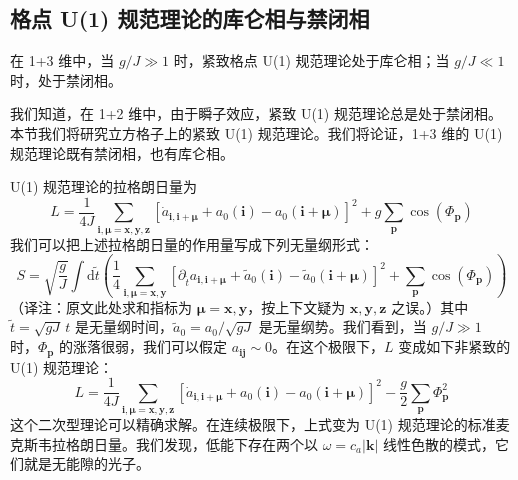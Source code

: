 \subsection{格点 U(1) 规范理论的库仑相与禁闭相}

\begin{keypoints}
\item 在 1+3 维中，当 $g/J\gg1$ 时，紧致格点 U(1) 规范理论处于库仑相；当 $g/J\ll1$ 时，处于禁闭相。
\end{keypoints}

我们知道，在 1+2 维中，由于瞬子效应，紧致 U(1) 规范理论总是处于禁闭相。本节我们将研究立方格子上的紧致 U(1) 规范理论。我们将论证，1+3 维的 U(1) 规范理论既有禁闭相，也有库仑相。

U(1) 规范理论的拉格朗日量为
\begin{equation*}
L=\frac{1}{4J}\sum_{\pmb{i},\pmb{\mu}=\pmb{x},\pmb{y},\pmb{z}}\left[\dot{a}_{\pmb{i},\pmb{i}+\pmb{\mu}}+a_{0}(\pmb{i})-a_{0}(\pmb{i}+\pmb{\mu})\right]^{2}+g\sum_{\pmb{p}}\cos(\Phi_{\pmb{p}})
\end{equation*}
我们可以把上述拉格朗日量的作用量写成下列无量纲形式：
\begin{equation*}
S=\sqrt{\frac{g}{J}}\int\mathrm{d}\tilde{t}\left(\frac{1}{4}\sum_{\pmb{i},\pmb{\mu}=\pmb{x},\pmb{y}}\left[\partial_{\tilde{t}}a_{\pmb{i},\pmb{i}+\pmb{\mu}}+\tilde{a}_{0}(\pmb{i})-\tilde{a}_{0}(\pmb{i}+\pmb{\mu})\right]^{2}+\sum_{\pmb{p}}\cos(\Phi_{\pmb{p}})\right)
\end{equation*}
（译注：原文此处求和指标为 $\pmb{\mu}=\pmb{x},\pmb{y}$，按上下文疑为 $\pmb{x},\pmb{y},\pmb{z}$ 之误。）其中 $\tilde{t}=\sqrt{gJ}\,t$ 是无量纲时间，$\tilde{a}_{0}=a_{0}/\sqrt{gJ}$ 是无量纲势。我们看到，当 $g/J\gg1$ 时，$\Phi_{\pmb{p}}$ 的涨落很弱，我们可以假定 $a_{\pmb{i}\pmb{j}}\sim0$。在这个极限下，$L$ 变成如下非紧致的 U(1) 规范理论：
\begin{equation*}
L=\frac{1}{4J}\sum_{\pmb{i},\pmb{\mu}=\pmb{x},\pmb{y},\pmb{z}}\left[\dot{a}_{\pmb{i},\pmb{i}+\pmb{\mu}}+a_{0}(\pmb{i})-a_{0}(\pmb{i}+\pmb{\mu})\right]^{2}-\frac{g}{2}\sum_{\pmb{p}}\Phi_{\pmb{p}}^{2}
\end{equation*}
这个二次型理论可以精确求解。在连续极限下，上式变为 U(1) 规范理论的标准麦克斯韦拉格朗日量。我们发现，低能下存在两个以 $\omega=c_{a}|\pmb{k}|$ 线性色散的模式，它们就是无能隙的光子。


